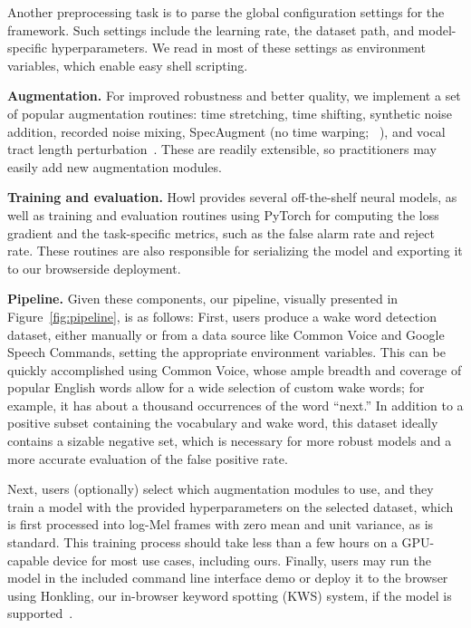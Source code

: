 \documentclass[11pt,a4paper]{article}
\newcommand{\parheader}[1]{{\smallskip \noindent \bf #1.}}
\begin{document}
Another preprocessing task is to parse the global configuration settings for the framework.
Such settings include the learning rate, the dataset path, and model-specific hyperparameters.
We read in most of these settings as environment variables, which enable easy shell scripting.

\parheader{Augmentation}
For improved robustness and better quality, we implement a set of popular augmentation routines: time stretching, time shifting, synthetic noise addition, recorded noise mixing, SpecAugment (no time warping; ~\citealp{park2019specaugment}), and vocal tract length perturbation~\cite{jaitly2013vocal}.
These are readily extensible, so practitioners may easily add new augmentation modules.

\parheader{Training and evaluation}
Howl provides several off-the-shelf neural models, as well as training and evaluation routines using PyTorch for computing the loss gradient and the task-specific metrics, such as the false alarm rate and reject rate.
These routines are also responsible for serializing the model and exporting it to our browserside deployment.

\parheader{Pipeline}
Given these components, our pipeline, visually presented in Figure~\ref{fig:pipeline}, is as follows: First, users produce a wake word detection dataset, either manually or from a data source like Common Voice and Google Speech Commands, setting the appropriate environment variables.
This can be quickly accomplished using Common Voice, whose ample breadth and coverage of popular English words allow for a wide selection of custom wake words; for example, it has about a thousand occurrences of the word ``next.''
In addition to a positive subset containing the vocabulary and wake word, this dataset ideally contains a sizable negative set, which is necessary for more robust models and a more accurate evaluation of the false positive rate.

Next, users (optionally) select which augmentation modules to use, and they train a model with the provided hyperparameters on the selected dataset, which is first processed into log-Mel frames with zero mean and unit variance, as is standard.
This training process should take less than a few hours on a GPU-capable device for most use cases, including ours.
Finally, users may run the model in the included command line interface demo or deploy it to the browser using Honkling, our in-browser keyword spotting (KWS) system, if the model is supported~\cite{lee2019honkling}.
\end{document}
